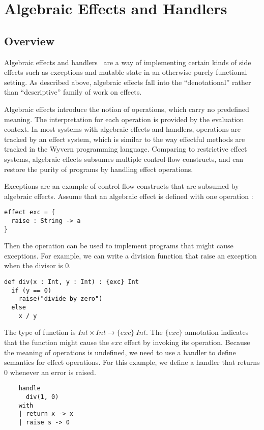 \section{Algebraic Effects and Handlers}

\subsection{Overview}
  Algebraic effects and handlers~\cite{plotkin03,plotkin09} are a way of implementing certain kinds of side effects such as exceptions and mutable state in an otherwise purely functional setting.  As described above, algebraic effects fall into the ``denotational'' rather than ``descriptive'' family of work on effects. 
  
Algebraic effects introduce the notion of operations, which carry no predefined meaning. The interpretation for each operation is provided by the evaluation context. In most systems with algebraic effects and handlers, operations are tracked by an effect system, which is similar to the way effectful methods are tracked in the Wyvern programming language. Comparing to restrictive effect systems, algebraic effects subsumes multiple control-flow constructs, and can restore the purity of programs by handling effect operations.

Exceptions are an example of control-flow constructs that are subsumed by algebraic effects. Assume that an algebraic effect  is defined with one operation :
\begin{verbatim}
effect exc = {
  raise : String -> a
}
\end{verbatim}
Then the operation  can be used to implement programs that might cause exceptions. For example, we can write a division function that raise an exception when the divisor is 0.
\begin{verbatim}
def div(x : Int, y : Int) : {exc} Int
  if (y == 0)
    raise("divide by zero")
  else
    x / y
\end{verbatim}

The type of function  is $Int \times Int \rightarrow \{exc\}\ Int$. The $\{exc\}$ annotation indicates that the function might cause the $exc$ effect by invoking its operation. Because the meaning of operations is undefined, we need to use a handler to define semantics for effect operations. For this example, we define a handler that returns 0 whenever an error is raised.

\begin{verbatim}
	handle 
	  div(1, 0)
	with 
	| return x -> x
	| raise s -> 0
\end{verbatim}

